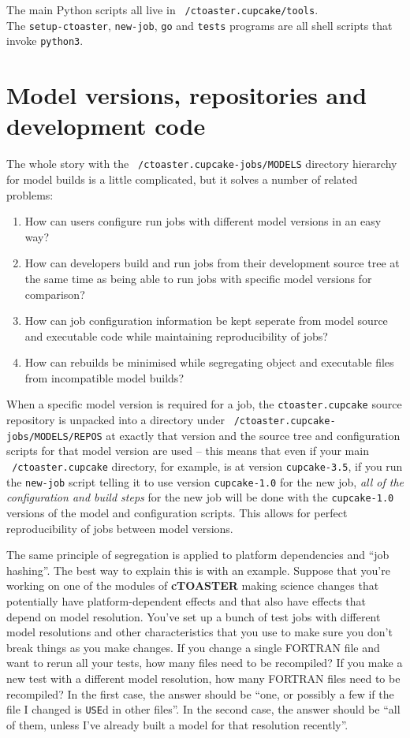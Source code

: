 \documentclass[a4paper,10pt,article]{memoir}
\begin{document}
The main Python scripts all live in \texttt{~/ctoaster.cupcake/tools}.  
\\The \texttt{setup-ctoaster}, \texttt{new-job}, \texttt{go} and
\texttt{tests} programs are all shell scripts that invoke \texttt{python3}.

\section{Model versions, repositories and development code}

The whole story with the \texttt{~/ctoaster.cupcake-jobs/MODELS} directory
hierarchy for model builds is a little complicated, but it solves a
number of related problems:
\begin{enumerate}
  \item{How can users configure run jobs with different model versions
    in an easy way?}
  \item{How can developers build and run jobs from their development
    source tree at the same time as being able to run jobs with
    specific model versions for comparison?}
  \item{How can job configuration information be kept seperate from
    model source and executable code while maintaining reproducibility
    of jobs?}
  \item{How can rebuilds be minimised while segregating object and
    executable files from incompatible model builds?}
\end{enumerate}

When a specific model version is required for a job, the
\texttt{ctoaster.cupcake} source repository is unpacked into a directory under
\texttt{~/ctoaster.cupcake-jobs/MODELS/REPOS} at exactly that version and the
source tree and configuration scripts for that model version are used
-- this means that even if your main \texttt{~/ctoaster.cupcake} directory, for
example, is at version \texttt{cupcake-3.5}, if you run the
\texttt{new-job} script telling it to use version \texttt{cupcake-1.0}
for the new job, \emph{all of the configuration and build steps} for
the new job will be done with the \texttt{cupcake-1.0} versions of the
model and configuration scripts.  This allows for perfect
reproducibility of jobs between model versions.

The same principle of segregation is applied to platform dependencies
and ``job hashing''.  The best way to explain this is with an
example.  Suppose that you're working on one of the modules of \textbf{cTOASTER}
making science changes that potentially have platform-dependent
effects and that also have effects that depend on model resolution.
You've set up a bunch of test jobs with different model resolutions
and other characteristics that you use to make sure you don't break
things as you make changes.  If you change a single FORTRAN file and
want to rerun all your tests, how many files need to be recompiled?
If you make a new test with a different model resolution, how many
FORTRAN files need to be recompiled?  In the first case, the answer
should be ``one, or possibly a few if the file I changed is
\texttt{USE}d in other files''.  In the second case, the answer should
be ``all of them, unless I've already built a model for that
resolution recently''.
\end{document}
